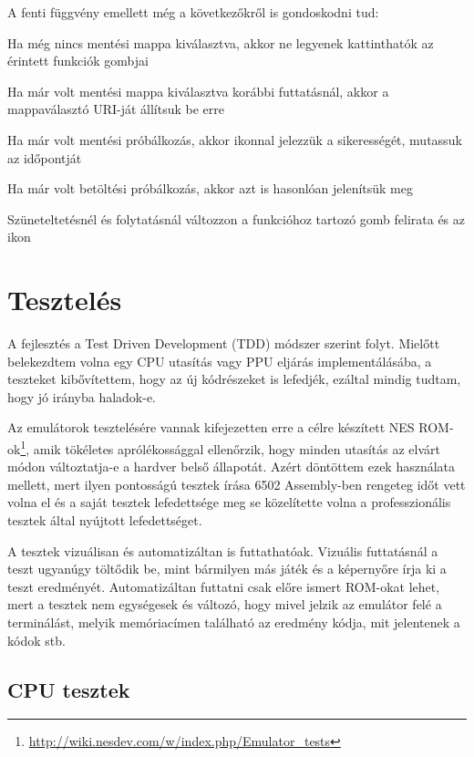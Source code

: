 A fenti függvény emellett még a következőkről is gondoskodni tud:
\begin{compactitem}
	\item Ha még nincs mentési mappa kiválasztva, akkor ne legyenek kattinthatók az érintett funkciók gombjai
	\item Ha már volt mentési mappa kiválasztva korábbi futtatásnál, akkor a mappaválasztó URI-ját állítsuk be erre
	\item Ha már volt mentési próbálkozás, akkor ikonnal jelezzük a sikerességét, mutassuk az időpontját
	\item Ha már volt betöltési próbálkozás, akkor azt is hasonlóan jelenítsük meg
	\item Szüneteltetésnél és folytatásnál változzon a funkcióhoz tartozó gomb felirata és az ikon
\end{compactitem}

\section{Tesztelés}

A fejlesztés a Test Driven Development (TDD) módszer szerint folyt. Mielőtt belekezdtem volna egy CPU utasítás vagy PPU eljárás implementálásába, a teszteket kibővítettem, hogy az új kódrészeket is lefedjék, ezáltal mindig tudtam, hogy jó irányba haladok-e.

Az emulátorok tesztelésére vannak kifejezetten erre a célre készített NES ROM-ok\footnote{\url{http://wiki.nesdev.com/w/index.php/Emulator_tests}}, amik tökéletes aprólékossággal ellenőrzik, hogy minden utasítás az elvárt módon változtatja-e a hardver belső állapotát. Azért döntöttem ezek használata mellett, mert ilyen pontosságú tesztek írása 6502 Assembly-ben rengeteg időt vett volna el és a saját tesztek lefedettsége meg se közelítette volna a professzionális tesztek által nyújtott lefedettséget.

A tesztek vizuálisan és automatizáltan is futtathatóak. Vizuális futtatásnál a teszt ugyanúgy töltődik be, mint bármilyen más játék és a képernyőre írja ki a teszt eredményét. Automatizáltan futtatni csak előre ismert ROM-okat lehet, mert a tesztek nem egységesek és változó, hogy mivel jelzik az emulátor felé a terminálást, melyik memóriacímen található az eredmény kódja, mit jelentenek a kódok stb.

\subsection{CPU tesztek}

